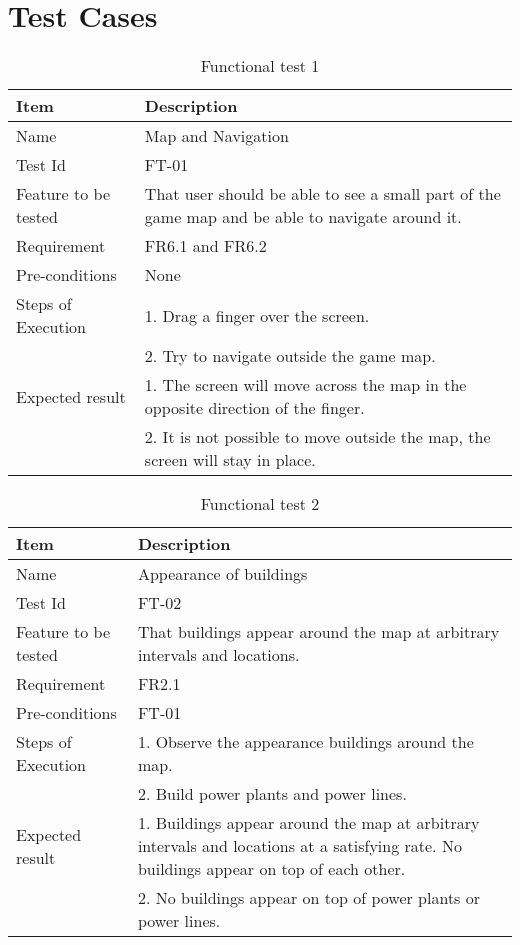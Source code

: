 \chapter{Test Cases}

\begin{table}[H]
\centering
	\begin{tabular}{ l | p{8cm} }
		\hline
		{\bf Item} & {\bf Description} \\ \hline
		Name & Map and Navigation \\ 
		Test Id & FT-01 \\ 
		Feature to be tested & That user should be able to see a small part of the game map and be able to navigate around it.\\ 
		Requirement & FR6.1 and FR6.2 \\ 
		Pre-conditions & None \\ 
		Steps of Execution & 1. Drag a finger over the screen. \\
		& 2. Try to navigate outside the game map. \\
		Expected result & 1. The screen will move across the map in the opposite direction of the finger.\\ 
		& 2. It is not possible to move outside the map, the screen will stay in place. \\
	\end{tabular}
	\caption{Functional test 1}
\end{table}

\begin{table}[H]
\centering
	\begin{tabular}{ l | p{8cm} }
		\hline
		{\bf Item} & {\bf Description} \\ \hline
		Name & Appearance of buildings \\ 
		Test Id & FT-02 \\ 
		Feature to be tested & That buildings appear around the map at arbitrary intervals and locations. \\ 
		Requirement & FR2.1 \\ 
		Pre-conditions & FT-01 \\ 
		Steps of Execution & 1. Observe the appearance buildings around the map.\\
		& 2. Build power plants and power lines. \\ 
		Expected result & 1. Buildings appear around the map at arbitrary intervals and locations at a satisfying rate. No buildings appear on top of each other. \\
		& 2. No buildings appear on top of power plants or power lines. \\
	\end{tabular}
	\caption{Functional test 2}
\end{table}

